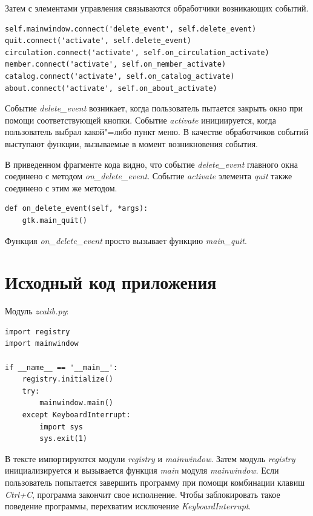 \documentclass[a4paper,openany,twoside,final]{book}
\providecommand*{\DUroletitlereference}[1]{\textsl{#1}}
\begin{document}
Затем с элементами управления связываются обработчики возникающих событий.

\begin{verbatim}
self.mainwindow.connect('delete_event', self.delete_event)
quit.connect('activate', self.delete_event)
circulation.connect('activate', self.on_circulation_activate)
member.connect('activate', self.on_member_activate)
catalog.connect('activate', self.on_catalog_activate)
about.connect('activate', self.on_about_activate)
\end{verbatim}

Событие \DUroletitlereference{delete\_event} возникает, когда пользователь пытается закрыть окно при помощи соответствующей кнопки.  Событие \DUroletitlereference{activate} инициируется, когда пользователь выбрал какой"=либо пункт меню.  В качестве обработчиков событий выступают функции, вызываемые в момент возникновения события.

В приведенном фрагменте кода видно, что событие \DUroletitlereference{delete\_event} главного окна соединено с методом \DUroletitlereference{on\_delete\_event}.  Событие \DUroletitlereference{activate} элемента \DUroletitlereference{quit} также соединено с этим же методом.

\begin{verbatim}
def on_delete_event(self, *args):
    gtk.main_quit()
\end{verbatim}

Функция \DUroletitlereference{on\_delete\_event} просто вызывает функцию \DUroletitlereference{main\_quit}.


\section{Исходный код приложения%
  \label{id52}%
}

Модуль \DUroletitlereference{zcalib.py}:

\begin{verbatim}
import registry
import mainwindow

if __name__ == '__main__':
    registry.initialize()
    try:
        mainwindow.main()
    except KeyboardInterrupt:
        import sys
        sys.exit(1)
\end{verbatim}

В тексте импортируются модули \DUroletitlereference{registry} и \DUroletitlereference{mainwindow}.  Затем модуль \DUroletitlereference{registry} инициализируется и вызывается функция \DUroletitlereference{main} модуля \DUroletitlereference{mainwindow}.  Если пользователь попытается завершить программу при помощи комбинации клавиш \DUroletitlereference{Ctrl+C}, программа закончит свое исполнение.  Чтобы заблокировать такое поведение программы, перехватим исключение \DUroletitlereference{KeyboardInterrupt}.
\end{document}
